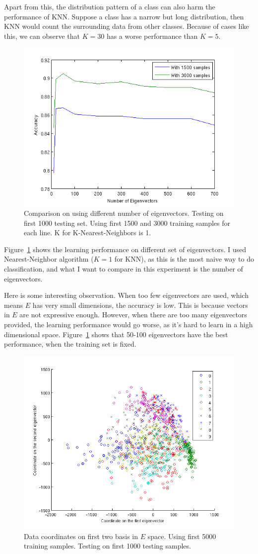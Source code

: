 \documentclass[10pt]{article}
\begin{document}
Apart from this, the distribution pattern of a class can also
harm the performance of KNN\@. Suppose a class has a narrow but long
distribution, then KNN would count the surrounding data from other
classes. Because of cases like this, we can observe that $K=30$ has a
worse performance than $K=5$.

\hfill

\begin{figure}
\centering
\includegraphics[width=0.55\columnwidth]{diffEVector.png}
\caption{Comparison on using different number of eigenvectors.
Testing on first 1000 testing set. Using first 1500 and 3000 training
samples for each line.  K for K-Nearest-Neighbors is 1.}
\label{fig:evec}
\end{figure}

Figure~\ref{fig:evec} shows the learning performance on different set
of eigenvectors. I used Nearest-Neighbor algorithm ($K = 1$ for KNN),
as this is the most naive way to do classification, and what I want to
compare in this experiment is the number of eigenvectors.

Here is some interesting observation. When too few
eigenvectors are used, which means $E$ has very small dimensions, the
accuracy is low. This is because vectors in $E$ are not expressive
enough. However, when there are too many eigenvectors provided, the
learning performance would go worse, as it's hard to learn in a high
dimensional space.  Figure~\ref{fig:evec} shows that 50-100
eigenvectors have the best performance, when the training set is
fixed.

\hfill

\begin{figure}
\centering
\includegraphics[width=0.55\columnwidth]{twod_digit.png}
\caption{Data coordinates on first two basis in $E$ space.  Using
first 5000 training samples. Testing on first 1000 testing samples.}
\label{fig:twod}
\end{figure}
\end{document}
